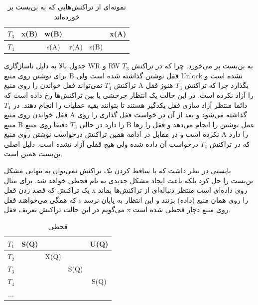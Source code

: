 \documentclass[a4paper]{article}
\begin{document}
\begin{LTR}
    \begin{table}[h]
        \begin{RTL}
            \caption{نمونه‌ای از تراکنش‌هایی که به بن‌بست بر خورده‌اند}
        \end{RTL}
        \centering
            \begin{tabular}{c|c|c|c|c|c}
                $T_{3}$ & x(B) & w(B) & & & x(A) \\ \hline
                $T_{4}$ & & s(A) & r(A) & s(B) & \\
            \end{tabular}
    \end{table}
\end{LTR}

جدول بالا به دلیل ناسازگاری WR و RW به بن‌بست بر می‌خورد. چرا که در تراکنش
$T_{3}$ برای نوشتن روی منبع B قفل نوشتن گذاشته شده است ولی Unlock نشده است و
تراکنش $T_{4}$ نمی‌تواند قفل خواندن را روی منبع A بگذارد چرا که تراکنش $T_{3}$
هنوز قفل را آزاد نکرده است. در این حالت یک انتظار چرخشی یا 
بین تراکنش‌ها رخ داده است که دائما منتظر آزاد سازی قفل یکدگیر هستند تا بتوانند
بقیه عملیات را انجام دهند. در $T_4$ قفل خواندن روی منبع A گذاشته می‌شود و بعد از
آن در خواست قفل گذاری را روی منبع B را دارد در حالی $T_3$ دقیقا روی منبع B عمل
نوشتن را انجام می‌دهد و قفل را رها نکرده است و در مقابل در ادامه همین تراکنش
درخواست نوشتن روی منبع A را دارد که در تراکنش $T_4$ درخواست آن داده شده ولی هیچ
قفلی آزاد نشده است. دلیل اصلی بن‌بست همین است.

بایستی در نظر داشت که با ساقط کردن یک تراکنش نمی‌توان به تنهایی مشکل بن‌بست را
حل کرد بلکه باعث ایجاد مشکل جدیدی به نام قحطی خواهد شد.  برای مثال یک تراکنش که
قصد زدن قفل x روی داده‌ای است منتظر دنباله‌ای از تراکنش‌ها بماند که همگی
می‌خواهند قفل s را روی همان منبع (داده) بزنند و این انتظار به پایان نرسد می‌گویم
در این حالت تراکنش تعریف قفل x روی منبع دچار قحطی شده است.

\begin{LTR}
    \begin{table}[h]
        \begin{RTL}
            \caption{قحطی}
        \end{RTL}
        \centering
            \begin{tabular}{c|c|c|c|c}
                $T_{1}$ & S(Q) & & & U(Q) \\ \hline
                $T_{2}$ & & X(Q) & & \\ \hline
                $T_{3}$ & & & S(Q) & \\ \hline
                $T_{4}$ & & & & S(Q) \\ \hline
                $...$ & & & & \\ 
            \end{tabular}
    \end{table}
\end{LTR}
\end{document}
